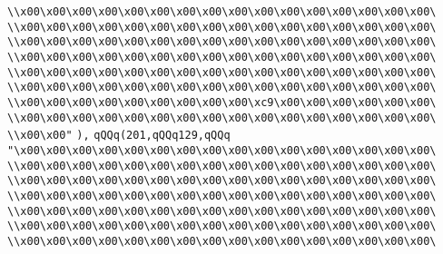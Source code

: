 \verb|\\x00\x00\x00\x00\x00\x00\x00\x00\x00\x00\x00\x00\x00\x00\x00\x00\|\newline
\verb|\\x00\x00\x00\x00\x00\x00\x00\x00\x00\x00\x00\x00\x00\x00\x00\x00\|\newline
\verb|\\x00\x00\x00\x00\x00\x00\x00\x00\x00\x00\x00\x00\x00\x00\x00\x00\|\newline
\verb|\\x00\x00\x00\x00\x00\x00\x00\x00\x00\x00\x00\x00\x00\x00\x00\x00\|\newline
\verb|\\x00\x00\x00\x00\x00\x00\x00\x00\x00\x00\x00\x00\x00\x00\x00\x00\|\newline
\verb|\\x00\x00\x00\x00\x00\x00\x00\x00\x00\x00\x00\x00\x00\x00\x00\x00\|\newline
\verb|\\x00\x00\x00\x00\x00\x00\x00\x00\x00\xc9\x00\x00\x00\x00\x00\x00\|\newline
\verb|\\x00\x00\x00\x00\x00\x00\x00\x00\x00\x00\x00\x00\x00\x00\x00\x00\|\newline
\verb|\\x00\x00"|\newline
\verb|),|\newline
\verb|qQQq(201,qQQq129,qQQq|\newline
\verb|"\x00\x00\x00\x00\x00\x00\x00\x00\x00\x00\x00\x00\x00\x00\x00\x00\|\newline
\verb|\\x00\x00\x00\x00\x00\x00\x00\x00\x00\x00\x00\x00\x00\x00\x00\x00\|\newline
\verb|\\x00\x00\x00\x00\x00\x00\x00\x00\x00\x00\x00\x00\x00\x00\x00\x00\|\newline
\verb|\\x00\x00\x00\x00\x00\x00\x00\x00\x00\x00\x00\x00\x00\x00\x00\x00\|\newline
\verb|\\x00\x00\x00\x00\x00\x00\x00\x00\x00\x00\x00\x00\x00\x00\x00\x00\|\newline
\verb|\\x00\x00\x00\x00\x00\x00\x00\x00\x00\x00\x00\x00\x00\x00\x00\x00\|\newline
\verb|\\x00\x00\x00\x00\x00\x00\x00\x00\x00\x00\x00\x00\x00\x00\x00\x00\|\newline
